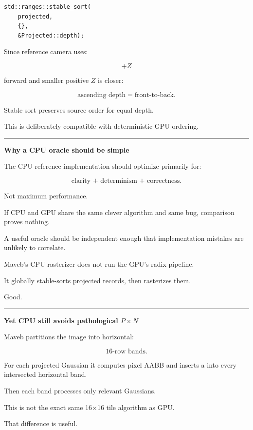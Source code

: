 \begin{verbatim}
std::ranges::stable_sort(
    projected,
    {},
    &Projected::depth);
\end{verbatim}

Since reference camera uses:

\[
+Z
\]

forward and smaller positive \(Z\) is closer:

\[
\boxed{
\text{ascending depth}
=
\text{front-to-back}.
}
\]

Stable sort preserves source order for equal depth.

This is deliberately compatible with deterministic GPU ordering.

\begin{center}\rule{0.5\linewidth}{0.5pt}\end{center}

\textbf{Why a CPU oracle should be simple}

The CPU reference implementation should optimize primarily for:

\[
\boxed{
\text{clarity + determinism + correctness}.
}
\]

Not maximum performance.

If CPU and GPU share the same clever algorithm and same bug, comparison proves nothing.

A useful oracle should be independent enough that implementation mistakes are unlikely to correlate.

Maveb's CPU rasterizer does not run the GPU's radix pipeline.

It globally stable-sorts projected records, then rasterizes them.

Good.

\begin{center}\rule{0.5\linewidth}{0.5pt}\end{center}

\textbf{Yet CPU still avoids pathological \(P\times N\)}

Maveb partitions the image into horizontal:

\[
16\text{-row bands}.
\]

For each projected Gaussian it computes pixel AABB and inserts a  into every intersected horizontal band.

Then each band processes only relevant Gaussians.

This is not the exact same 16×16 tile algorithm as GPU.

That difference is useful.


